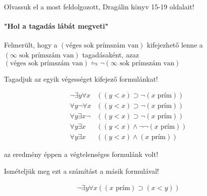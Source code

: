 \documentclass{article}
\begin{document}
Olvassuk el a most feldolgozott, Dragálin könyv 15-19 oldalait!

\paragraph{"Hol a tagadás lábát megveti"}

Felmerült, hogy a $(\text{véges sok prímszám van})$ kifejezhető lenne a $(\infty \text{ sok prímszám van})$ tagadásaként, azaz
$(\text{véges sok prímszám van}) \leftrightharpoons   \neg(\infty \text{ sok prímszám van})$ 

Tagadjuk az egyik végességet kifejező formulánkat!


 \begin{align*}
 \neg \exists y \forall x &((y<x) \supset \neg (x \text{ prím}))\\
 \forall y \neg\forall x &((y<x) \supset \neg (x \text{ prím}))\\
 \forall y \exists x \neg&((y<x) \supset \neg (x \text{ prím}))\\
 \forall y \exists x &((y<x) \wedge \neg\neg (x \text{ prím}))\\
 \forall y \exists x &((y<x) \wedge (x \text{ prím}))
 \end{align*} 
 
 az eredmény éppen a végtelenséges formulánk volt!
 
 Ismételjük meg ezt a számítást a másik formulával!

 \begin{align*}
 \neg \exists y \forall x ((x \text{ prím}) \supset (x<y))\\
 \end{align*} 
\end{document}
